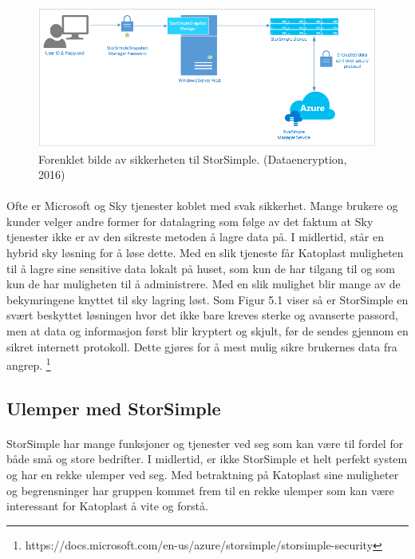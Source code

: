 \begin{figure}[H]
\centering
\includegraphics[width=6.5in]{Bilder/storsimple2.png}
\caption{Forenklet bilde av sikkerheten til StorSimple. (Dataencryption, 2016)}
\end{figure}

\paragraph{} Ofte er Microsoft og Sky tjenester koblet med svak sikkerhet. Mange brukere og kunder velger andre former for datalagring som følge av det faktum at Sky tjenester ikke er av den sikreste metoden å lagre data på. I midlertid, står en hybrid sky løsning for å løse dette. Med en slik tjeneste får Katoplast muligheten til å lagre sine sensitive data lokalt på huset, som kun de har tilgang til og som kun de har muligheten til å administrere. Med en slik mulighet blir mange av de bekymringene knyttet til sky lagring løst. Som Figur 5.1 viser så er StorSimple en svært beskyttet løsningen hvor det ikke bare kreves sterke og avanserte passord, men at data og informasjon først blir kryptert og skjult, før de sendes gjennom en sikret internett protokoll. Dette gjøres for å mest mulig sikre brukernes data fra angrep. 
\footnote{https://docs.microsoft.com/en-us/azure/storsimple/storsimple-security}

\subsection{Ulemper med StorSimple}
\paragraph{} StorSimple har mange funksjoner og tjenester ved seg som kan være til fordel for både små og store bedrifter. I midlertid, er ikke StorSimple et helt perfekt system og har en rekke ulemper ved seg. Med betraktning på Katoplast sine muligheter og begrensninger har gruppen kommet frem til en rekke ulemper som kan være interessant for Katoplast å vite og forstå.

